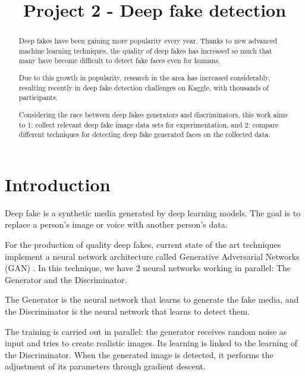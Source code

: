 \documentclass{bmvc2k}
\title{Project 2 - Deep fake detection}
\begin{document}
\maketitle

\begin{abstract}
Deep fakes have been gaining more popularity every year. Thanks to new advanced machine learning techniques, the quality of deep fakes has increased so much that many have become difficult to detect fake faces even for humans.

Due to this growth in popularity, research in the area has increased considerably, resulting recently in deep fake detection challenges on Kaggle, with thousands of participants.

Considering the race between deep fakes generators and discriminators, this work aims to 1: collect relevant deep fake image data sets for experimentation, and 2: compare different techniques for detecting deep fake generated faces on the collected data.

\end{abstract}

\section{Introduction}
\label{sec:intro}

Deep fake is a synthetic media generated by deep learning models. The goal is to replace a person's image or voice with another person's data.

For the production of quality deep fakes, current state of the art techniques implement a neural network architecture called Generative Adversarial Networks (GAN) \cite{goodfellow_generative_2014}. In this technique, we have 2 neural networks working in parallel: The Generator and the Discriminator.

The Generator is the neural network that learns to generate the fake media, and the Discriminator is the neural network that learns to detect them.

The training is carried out in parallel: the generator receives random noise as input and tries to create realistic images. Its learning is linked to the learning of the Discriminator. When the generated image is detected, it performs the adjustment of its parameters through gradient descent. 
\end{document}
